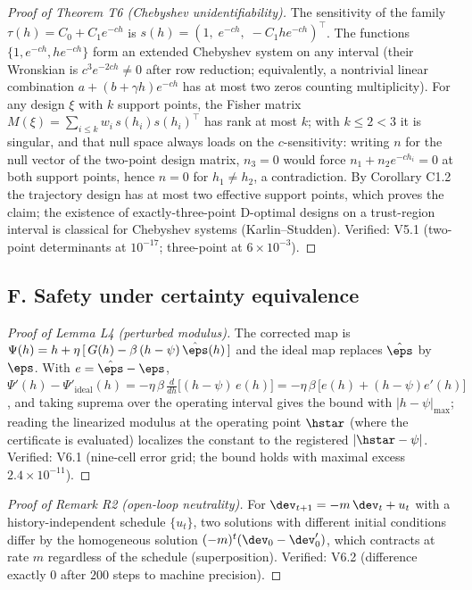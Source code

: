 \begin{proof}[Proof of Theorem T6 (Chebyshev unidentifiability)]
The sensitivity of the family $\tau(h) = C_0 + C_1 e^{-ch}$ is
$s(h) = (1,\; e^{-ch},\; -C_1 h e^{-ch})^\top$. The functions
$\{1, e^{-ch}, h e^{-ch}\}$ form an extended Chebyshev system on any
interval (their Wronskian is $c^3 e^{-2ch} \ne 0$ after row reduction;
equivalently, a nontrivial linear combination
$a + (b + \gamma h)e^{-ch}$ has at most two zeros counting multiplicity).
For any design $\xi$ with $k$ support points, the Fisher matrix
$M(\xi) = \sum_{i\le k} w_i\, s(h_i) s(h_i)^\top$ has rank at most $k$;
with $k \le 2 < 3$ it is singular, and that null space always loads on
the $c$-sensitivity: writing $n$ for the null vector of the two-point
design matrix, $n_3 = 0$ would force $n_1 + n_2 e^{-ch_i} = 0$ at both
support points, hence $n = 0$ for $h_1 \neq h_2$, a contradiction. By
Corollary C1.2 the trajectory design has at most two effective support
points, which proves the claim; the existence of exactly-three-point
D-optimal designs on a trust-region interval is classical for Chebyshev
systems (Karlin--Studden). Verified: V5.1 (two-point determinants at
$10^{-17}$; three-point at $6\times 10^{-3}$).
\end{proof}

\subsection*{F. Safety under certainty equivalence}

\begin{proof}[Proof of Lemma L4 (perturbed modulus)]
The corrected map is $\Psi(h) = h + \eta\,[\,G(h) - \beta\,(h-\psi)\,
\hat\eps(h)\,]$ and the ideal map replaces $\hat\eps$ by $\eps$. With
$e = \hat\eps - \eps$,
$\Psi'(h) - \Psi'_{\mathrm{ideal}}(h) = -\eta\,\beta\,\tfrac{d}{dh}
\big[(h-\psi)\,e(h)\big] = -\eta\,\beta\,\big[e(h) + (h-\psi)e'(h)\big]$,
and taking suprema over the operating interval gives the bound with
$|h-\psi|_{\max}$; reading the linearized modulus at the operating point
$\hstar$ (where the certificate is evaluated) localizes the constant to
the registered $|\hstar-\psi|$. Verified: V6.1 (nine-cell error grid; the bound holds
with maximal excess $2.4\times10^{-11}$).
\end{proof}

\begin{proof}[Proof of Remark R2 (open-loop neutrality)]
For $\dev_{t+1} = -m\,\dev_t + u_t$ with a history-independent schedule
$\{u_t\}$, two solutions with different initial conditions differ by the
homogeneous solution $(-m)^t(\dev_0 - \dev_0')$, which contracts at rate
$m$ regardless of the schedule (superposition). Verified: V6.2 (difference
exactly $0$ after $200$ steps to machine precision).
\end{proof}

